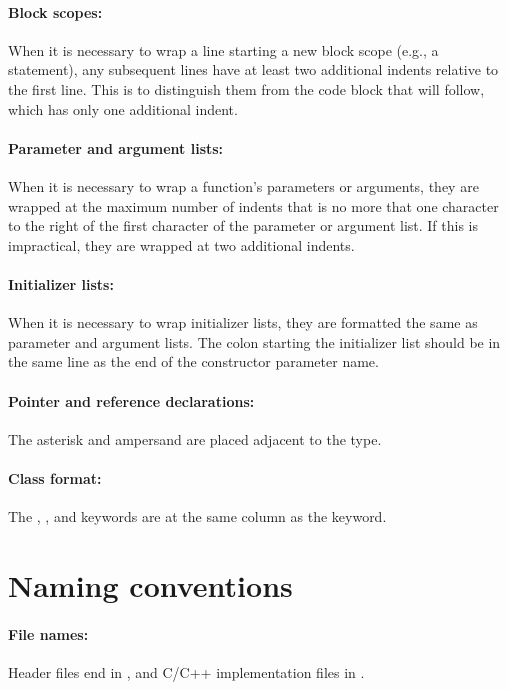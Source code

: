 \documentclass[footinclude=false,11pt,DIV11]{scrartcl}
\begin{document}
\paragraph{Block scopes:} When it is necessary to wrap a line starting a new 
block scope (e.g., a  statement), any subsequent lines have at least 
two additional indents relative to the first line. This is to distinguish them 
from the code block that will follow, which has only one additional indent.

\paragraph{Parameter and argument lists:} When it is necessary to wrap a 
function's parameters or arguments, they are wrapped at the maximum number of 
indents that is no more that one character to the right of the first character 
of the parameter or argument list. If this is impractical, they are wrapped at 
two additional indents.

\paragraph{Initializer lists:} When it is necessary to wrap initializer lists, 
they are formatted the same as parameter and argument lists. The colon \code{:} 
starting the initializer list should be in the same line as the end of the 
constructor parameter name.

\paragraph{Pointer and reference declarations:} The asterisk and ampersand are placed
adjacent to the type.

\paragraph{Class format:} The , , and 
keywords are at the same column as the  keyword.

\section{Naming conventions}

\paragraph{File names:} Header files end in , and C/C++ implementation files
in .
\end{document}
